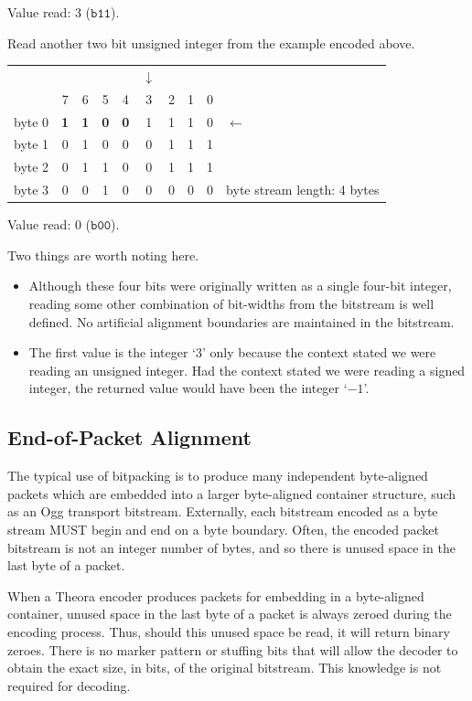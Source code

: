 \documentclass[11pt,letterpaper]{book}
\newcommand{\bin}[1]{\ensuremath{\mathtt{b#1}}}
\numberwithin{equation}{chapter}
\numberwithin{figure}{chapter}
\numberwithin{table}{chapter}
\begin{document}
Value read: 3 (\bin{11}).

Read another two bit unsigned integer from the example encoded above.

\begin{tabular}{r|ccccccccl}
\multicolumn{1}{r}{} &&&&&$\downarrow$&&&&              \\
         & 7 & 6 & 5 & 4 & 3 & 2 & 1 & 0 &              \\\cline{1-9}
byte 0   & \textbf{1} & \textbf{1} & \textbf{0} & \textbf{0} &
                           1 & 1 & 1 & 0 & $\leftarrow$ \\
byte 1   & 0 & 1 & 0 & 0 & 0 & 1 & 1 & 1 &              \\
byte 2   & 0 & 1 & 1 & 0 & 0 & 1 & 1 & 1 &              \\
byte 3   & 0 & 0 & 1 & 0 & 0 & 0 & 0 & 0 &
byte stream length: 4 bytes
\end{tabular}
\vspace{\baselineskip}

Value read: 0 (\bin{00}).

Two things are worth noting here.
\begin{itemize}
\item
Although these four bits were originally written as a single four-bit integer,
 reading some other combination of bit-widths from the bitstream is well
 defined.
No artificial alignment boundaries are maintained in the bitstream.
\item
The first value is the integer `$3$' only because the context stated we were
 reading an unsigned integer.
Had the context stated we were reading a signed integer, the returned value
 would have been the integer `$-1$'.
\end{itemize}

\subsection{End-of-Packet Alignment}

The typical use of bitpacking is to produce many independent byte-aligned
 packets which are embedded into a larger byte-aligned container structure,
 such as an Ogg transport bitstream.
Externally, each bitstream encoded as a byte stream MUST begin and end on a
 byte boundary.
Often, the encoded packet bitstream is not an integer number of bytes, and so
 there is unused space in the last byte of a packet.

When a Theora encoder produces packets for embedding in a byte-aligned
 container, unused space in the last byte of a packet is always zeroed during
 the encoding process.
Thus, should this unused space be read, it will return binary zeroes.
There is no marker pattern or stuffing bits that will allow the decoder to
 obtain the exact size, in bits, of the original bitstream.
This knowledge is not required for decoding.
\end{document}
